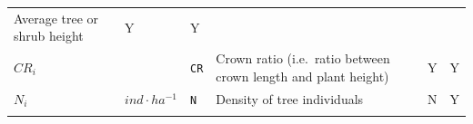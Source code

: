 \documentclass[]{book}
\begin{document}
\begin{longtable}[]{@{}llllll@{}}
\begin{minipage}[t]{0.43\columnwidth}
Average tree or shrub height\strut
\end{minipage} & \begin{minipage}[t]{0.07\columnwidth}\raggedright\strut
Y\strut
\end{minipage} & \begin{minipage}[t]{0.07\columnwidth}\raggedright\strut
Y\strut
\end{minipage}\tabularnewline
\begin{minipage}[t]{0.10\columnwidth}\raggedright\strut
\(CR_i\)\strut
\end{minipage} & \begin{minipage}[t]{0.09\columnwidth}\raggedright\strut
\strut
\end{minipage} & \begin{minipage}[t]{0.06\columnwidth}\raggedright\strut
\texttt{CR}\strut
\end{minipage} & \begin{minipage}[t]{0.43\columnwidth}\raggedright\strut
Crown ratio (i.e.~ratio between crown length and plant height)\strut
\end{minipage} & \begin{minipage}[t]{0.07\columnwidth}\raggedright\strut
Y\strut
\end{minipage} & \begin{minipage}[t]{0.07\columnwidth}\raggedright\strut
Y\strut
\end{minipage}\tabularnewline
\begin{minipage}[t]{0.10\columnwidth}\raggedright\strut
\(N_i\)\strut
\end{minipage} & \begin{minipage}[t]{0.09\columnwidth}\raggedright\strut
\(ind · ha^{-1}\)\strut
\end{minipage} & \begin{minipage}[t]{0.06\columnwidth}\raggedright\strut
\texttt{N}\strut
\end{minipage} & \begin{minipage}[t]{0.43\columnwidth}\raggedright\strut
Density of tree individuals\strut
\end{minipage} & \begin{minipage}[t]{0.07\columnwidth}\raggedright\strut
N\strut
\end{minipage} & \begin{minipage}[t]{0.07\columnwidth}\raggedright\strut
Y\strut
\end{minipage}\tabularnewline
\begin{minipage}[t]{0.10\columnwidth}\raggedright\strut

\end{minipage}
\end{longtable}
\end{document}
